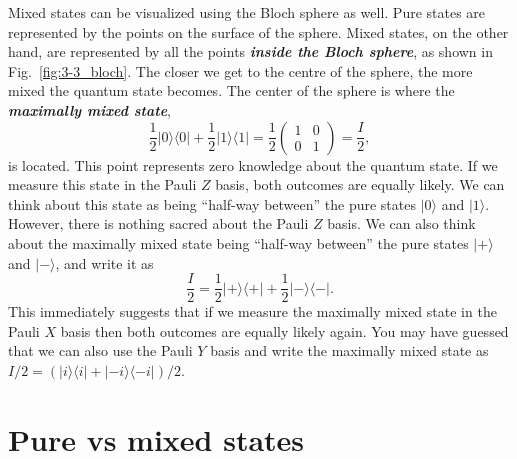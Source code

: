 Mixed states can be visualized using the Bloch sphere as well.
Pure states are represented by the points on the surface of the sphere.
Mixed states, on the other hand, are represented by all the points \textbf{\emph{inside the Bloch sphere}}, as shown in Fig.~\ref{fig:3-3_bloch}.
The closer we get to the centre of the sphere, the more mixed the quantum state becomes.
The center of the sphere is where the \textbf{\emph{maximally mixed state}},
\begin{equation}
    \frac{1}{2} |0\rangle\langle0| + \frac{1}{2} |1\rangle\langle1| = \frac{1}{2} \begin{pmatrix} 1 & 0 \\ 0 & 1 \end{pmatrix} = \frac{I}{2},
\end{equation}
is located.
This point represents zero knowledge about the quantum state.
If we measure this state in the Pauli $Z$ basis, both outcomes are equally likely.
We can think about this state as being ``half-way between'' the pure states $|0\rangle$ and $|1\rangle$.
However, there is nothing sacred about the Pauli $Z$ basis.
We can also think about the maximally mixed state being ``half-way between'' the pure states $|+\rangle$ and $|-\rangle$, and write it as
\begin{equation}
    \frac{I}{2} = \frac{1}{2} |+\rangle\langle+| + \frac{1}{2} |-\rangle\langle-|.
\end{equation}
This immediately suggests that if we measure the maximally mixed state in the Pauli $X$ basis then both outcomes are equally likely again.
You may have guessed that we can also use the Pauli $Y$ basis and write the maximally mixed state as $I/2 = ( |i\rangle\langle i| + |-i\rangle\langle-i| ) / 2$.






\section{Pure vs mixed states}
\label{sec:3-4_pure_vs_mixed}

